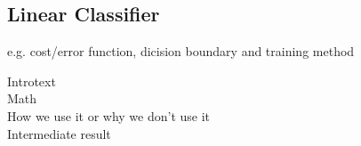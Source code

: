 \subsection{Linear Classifier}

e.g. cost/error function, dicision boundary and training method

Introtext\\

Math\\

How we use it or why we don't use it\\

Intermediate result\\

